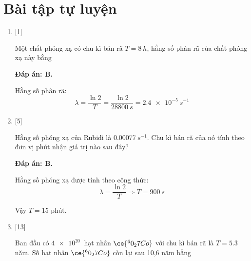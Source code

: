 \section{Bài tập tự luyện}
\begin{enumerate}[label=\bfseries Câu \arabic*:]
	\item {} [1]
	\cauhoi
	{Một chất phóng xạ có chu kì bán rã $T=\SI{8}{h}$, hằng số phân rã của chất phóng xạ này bằng
	}
	
	\loigiai
	{		\textbf{Đáp án: B.}
		
		Hằng số phân rã:
		$$\lambda = \dfrac{\ln 2}{T} = \dfrac{\ln 2}{\SI{28800}{s}} = \SI{2.4e-5}{s^{-1}}$$
		
	}
	\item {} [5]
	\cauhoi
	{Hằng số phóng xạ của Rubidi là $\SI{0.00077}{s^{-1}}$. Chu kì bán rã của nó tính theo đơn vị phút nhận giá trị nào sau đây?
	}
	
	\loigiai
	{		\textbf{Đáp án: B.}
		
		Hằng số phóng xạ được tính theo công thức:
		$$\lambda = \dfrac{\ln 2}{T} \Rightarrow T = \SI{900}{s}$$
		
		Vậy $T=15$ phút.
		
	}
	
	\item {} [13]
	\cauhoi
	{Ban đầu có $\SI{4e20}{}$ hạt nhân $\ce{^60_27 Co}$ với chu kì bán rã là $T=\SI{5.3}{}$ năm. Số hạt nhân $\ce{^60_27 Co}$ còn lại sau 10,6 năm bằng
	}
	

\end{enumerate}
